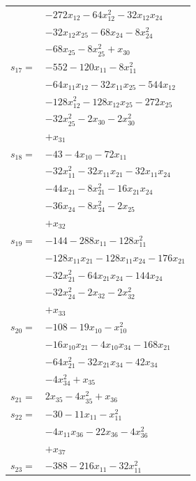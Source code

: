 \begin{longtable}{@{}r@{\;}l@{}}
 & \(\displaystyle -272x_{12} -64x_{12}^{2} -32x_{12}x_{24}\) \\
 & \(\displaystyle -32x_{12}x_{25} -68x_{24} -8x_{24}^{2}\) \\
 & \(\displaystyle -68x_{25} -8x_{25}^{2} +x_{30}\) \\[3pt]
\(s_{17}=\) & \(\displaystyle -552 -120x_{11} -8x_{11}^{2}\) \\
 & \(\displaystyle -64x_{11}x_{12} -32x_{11}x_{25} -544x_{12}\) \\
 & \(\displaystyle -128x_{12}^{2} -128x_{12}x_{25} -272x_{25}\) \\
 & \(\displaystyle -32x_{25}^{2} -2x_{30} -2x_{30}^{2}\) \\
 & \(\displaystyle +x_{31}\) \\[3pt]
\(s_{18}=\) & \(\displaystyle -43 -4x_{10} -72x_{11}\) \\
 & \(\displaystyle -32x_{11}^{2} -32x_{11}x_{21} -32x_{11}x_{24}\) \\
 & \(\displaystyle -44x_{21} -8x_{21}^{2} -16x_{21}x_{24}\) \\
 & \(\displaystyle -36x_{24} -8x_{24}^{2} -2x_{25}\) \\
 & \(\displaystyle +x_{32}\) \\[3pt]
\(s_{19}=\) & \(\displaystyle -144 -288x_{11} -128x_{11}^{2}\) \\
 & \(\displaystyle -128x_{11}x_{21} -128x_{11}x_{24} -176x_{21}\) \\
 & \(\displaystyle -32x_{21}^{2} -64x_{21}x_{24} -144x_{24}\) \\
 & \(\displaystyle -32x_{24}^{2} -2x_{32} -2x_{32}^{2}\) \\
 & \(\displaystyle +x_{33}\) \\[3pt]
\(s_{20}=\) & \(\displaystyle -108 -19x_{10} -x_{10}^{2}\) \\
 & \(\displaystyle -16x_{10}x_{21} -4x_{10}x_{34} -168x_{21}\) \\
 & \(\displaystyle -64x_{21}^{2} -32x_{21}x_{34} -42x_{34}\) \\
 & \(\displaystyle -4x_{34}^{2} +x_{35}\) \\[3pt]
\(s_{21}=\) & \(\displaystyle 2x_{35} -4x_{35}^{2} +x_{36}\) \\[3pt]
\(s_{22}=\) & \(\displaystyle -30 -11x_{11} -x_{11}^{2}\) \\
 & \(\displaystyle -4x_{11}x_{36} -22x_{36} -4x_{36}^{2}\) \\
 & \(\displaystyle +x_{37}\) \\[3pt]
\(s_{23}=\) & \(\displaystyle -388 -216x_{11} -32x_{11}^{2}\) \\

\end{longtable}
